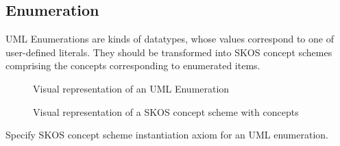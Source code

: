\subsection{Enumeration}

UML Enumerations \citep{uml2.5} are kinds of datatypes, whose values correspond to one
of user-defined literals. They should be transformed into SKOS \citep{skos-spec} concept schemes comprising the concepts corresponding to enumerated items. 

\begin{figure}[!ht]
	\centering
	\caption{Visual representation of an UML Enumeration}
	\label{fig:enumeration-uml-visual}
\end{figure}

\begin{figure}[!ht]
	\centering
	\caption{Visual representation of a SKOS concept scheme with concepts}
	\label{fig:enumeration-owl-visual}
\end{figure}

\begin{trule}
	\label{rule:enumeration-core}
	Specify SKOS concept scheme instantiation axiom for an UML enumeration.
\end{trule}

